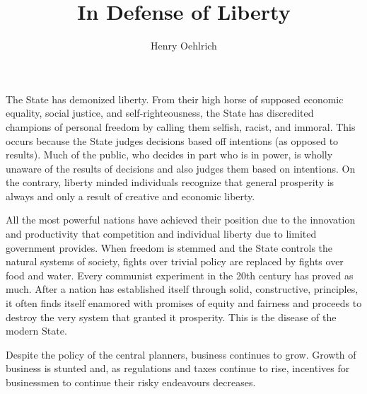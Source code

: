 \documentclass{article}
\author{Henry Oehlrich}
\title{In Defense of Liberty}
\begin{document}
\maketitle

The State has demonized liberty. From their high horse of supposed economic
equality, social justice, and self-righteousness, the State has discredited
champions of personal freedom by calling them selfish, racist, and immoral.
This occurs because the State judges decisions based off intentions (as opposed
to results). Much of the public, who decides in part who is in power, is wholly
unaware of the results of decisions and also judges them based on intentions.
On the contrary, liberty minded individuals recognize that general prosperity
is always and only a result of creative and economic liberty.

All the most powerful nations have achieved their position due to the
innovation and productivity that competition and individual liberty due to
limited government provides. When freedom is stemmed and the State controls the
natural systems of society, fights over trivial policy are replaced by fights
over food and water. Every communist experiment in the 20th century has proved
as much. After a nation has established itself through solid, constructive,
principles, it often finds itself enamored with promises of equity and fairness
and proceeds to destroy the very system that granted it prosperity. This is the
disease of the modern State.

Despite the policy of the central planners, business continues to grow. Growth
of business is stunted and, as regulations and taxes continue to rise,
incentives for businessmen to continue their risky endeavours decreases.
\end{document}
